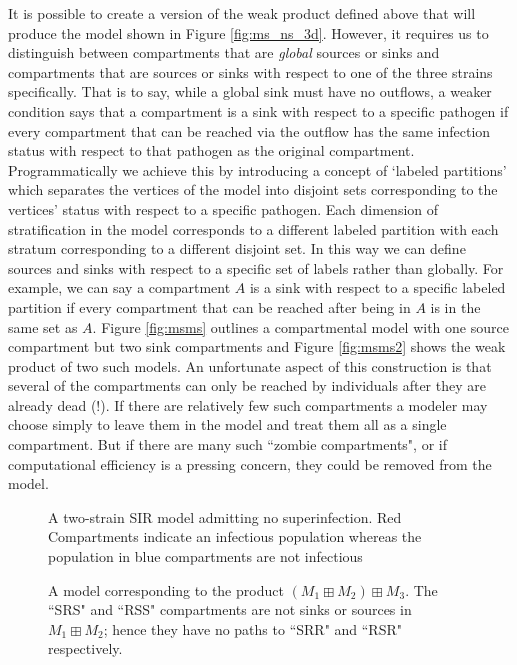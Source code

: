 It is possible to create a version of the weak product defined above that will produce the model shown in Figure \ref{fig:ms_ns_3d}. However, it requires us to distinguish between compartments that are \emph{global} sources or sinks and compartments that are sources or sinks with respect to one of the three strains specifically. That is to say, while a global sink must have no outflows, a weaker condition says that a compartment is a sink with respect to a specific pathogen if every compartment that can be reached via the outflow has the same infection status with respect to that pathogen as the original compartment. Programmatically we achieve this by introducing a concept of `labeled partitions' which separates the vertices of the model into disjoint sets corresponding to the vertices' status with respect to a specific pathogen. Each dimension of stratification in the model corresponds to a different labeled partition with each stratum corresponding to a different disjoint set. In this way we can define sources and sinks with respect to a specific set of labels rather than globally. For example, we can say a compartment $A$ is a sink with respect to a specific labeled partition if every compartment that can be reached after being in $A$ is in the same set as $A$. Figure \ref{fig:msms} outlines a compartmental model with one source compartment but two sink compartments and Figure \ref{fig:msms2} shows the weak product of two such models.
An unfortunate aspect of this construction is that several of the compartments can only be reached by individuals after they are already dead (!).
If there are relatively few such compartments a modeler may choose simply to leave them in the model and treat them all as a single compartment. But if there are many such ``zombie compartments", or if computational efficiency is a pressing concern, they could be removed  from the model.

\FloatBarrier
\begin{figure}
    \centering
    
    \caption{A two-strain SIR model admitting no superinfection. Red Compartments indicate an infectious population whereas the population in blue compartments are not infectious}
    \label{fig:ms_ns_2d}
\end{figure}

\begin{figure}
    \centering
    
    \caption{A model corresponding to the product $(M_1\boxplus M_2)\boxplus M_3$. The ``SRS" and ``RSS" compartments are not sinks or sources in $M_1\boxplus M_2$; hence they have no paths to ``SRR" and ``RSR" respectively.}
    \label{fig:wp_act}
\end{figure}

